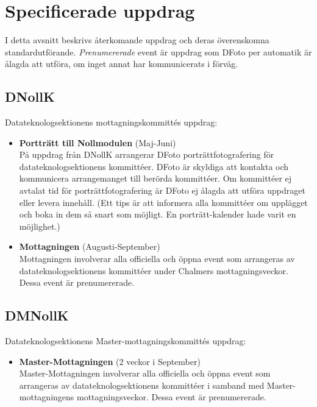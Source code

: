 \section{Specificerade uppdrag}
\label{Specificerade uppdrag}
I detta avsnitt beskrivs återkomande uppdrag och deras överenskomna standardutförande. \textit{Prenumererade} event är uppdrag som DFoto per automatik är ålagda att utföra, om inget annat har kommunicerats i förväg. 

\subsection{DNollK}
Datateknologsektionens mottagningskommittés uppdrag:
\begin{itemize}
    \item \textbf{Portträtt till Nollmodulen} (Maj-Juni)\\
    På uppdrag från DNollK arrangerar DFoto porträttfotografering för datateknologsektionens kommittéer. DFoto är skyldiga att kontakta och kommunicera arrangemanget till berörda kommittéer. Om kommittéer ej avtalat tid för porträttfotografering är DFoto ej ålagda att utföra uppdraget eller levera innehåll. (Ett tips är att informera alla kommittéer om upplägget och boka in dem så snart som möjligt. En porträtt-kalender hade varit en möjlighet.)
    
    \item \textbf{Mottagningen} (Augusti-September)\\
    Mottagningen involverar alla officiella och öppna event som arrangeras av datateknologsektionens kommittéer under Chalmers mottagningsveckor. Dessa event är prenumererade. 
    
\end{itemize}

\subsection{DMNollK}
Datateknologsektionens Master-mottagningskommittés uppdrag:
\begin{itemize}

    \item \textbf{Master-Mottagningen} (2 veckor i September)\\
    Master-Mottagningen involverar alla officiella och öppna event som arrangeras av datateknologsektionens kommittéer i samband med Master-mottagningens mottagningsveckor. Dessa event är prenumererade. 
    
\end{itemize}

